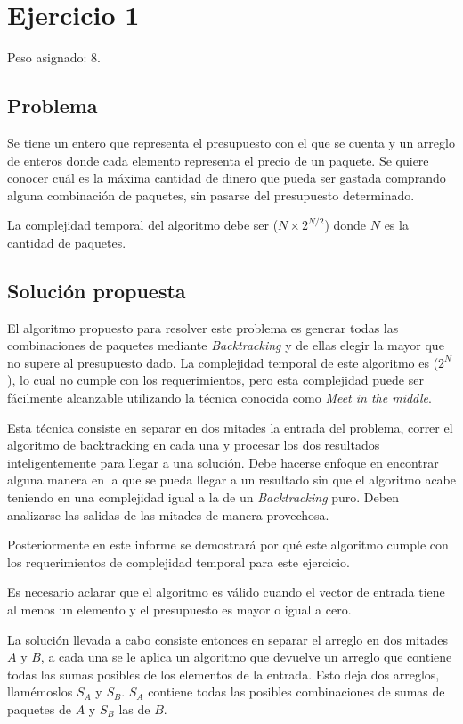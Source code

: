 \section{Ejercicio 1}

Peso asignado: 8.

\subsection{Problema}

Se tiene un entero que representa el presupuesto con el que se cuenta y un
arreglo de enteros donde cada elemento representa el precio de un paquete. Se
quiere conocer cuál es la máxima cantidad de dinero que pueda ser gastada
comprando alguna combinación de paquetes, sin pasarse del presupuesto
determinado.

La complejidad temporal del algoritmo debe ser \ord($N \times 2^{N / 2}$) donde
$N$ es la cantidad de paquetes.

\subsection{Solución propuesta}

El algoritmo propuesto para resolver este problema es generar todas las
combinaciones de paquetes mediante \textit{Backtracking} y de ellas elegir la
mayor que no supere al presupuesto dado. La complejidad temporal de este
algoritmo es \ord($2^N$), lo cual no cumple con los requerimientos, pero esta
complejidad puede ser fácilmente alcanzable utilizando la técnica conocida como
\textit{Meet in the middle}.

Esta técnica consiste en separar en dos mitades la entrada del problema, correr
el algoritmo de backtracking en cada una y procesar los dos resultados
inteligentemente para llegar a una solución. Debe hacerse enfoque en encontrar
alguna manera en la que se pueda llegar a un resultado sin que el algoritmo
acabe teniendo en una complejidad igual a la de un \textit{Backtracking} puro.
Deben analizarse las salidas de las mitades de manera provechosa.

Posteriormente en este informe se demostrará por qué este algoritmo cumple con
los requerimientos de complejidad temporal para este ejercicio.

Es necesario aclarar que el algoritmo es válido cuando el vector de entrada
tiene al menos un elemento y el presupuesto es mayor o igual a cero.

La solución llevada a cabo consiste entonces en separar el arreglo en dos
mitades $A$ y $B$, a cada una se le aplica un algoritmo que devuelve un arreglo
que contiene todas las sumas posibles de los elementos de la entrada. Esto deja
dos arreglos, llamémoslos $S_A$ y $S_B$. $S_A$ contiene todas las posibles
combinaciones de sumas de paquetes de $A$ y $S_B$ las de $B$.

